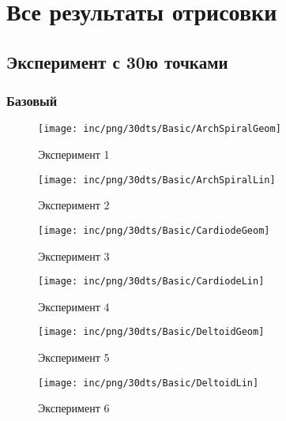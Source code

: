 \chapter{Все результаты отрисовки}
\label{cha:appendix1}

\section{Эксперимент с 30ю точками}
\subsection{Базовый}
\begin{figure}  
	\begin{minipage}{0,5\textwidth}
		\texttt{[image: inc/png/30dts/Basic/ArchSpiralGeom]}
		\label{fig:app1}
		\caption{Эксперимент 1}
	\end{minipage}
	\begin{minipage}{0,5\textwidth}
		\texttt{[image: inc/png/30dts/Basic/ArchSpiralLin]}
		\label{fig:app2}
		\caption{Эксперимент 2}
	\end{minipage}
	
	\begin{minipage}{0,5\textwidth}
		\texttt{[image: inc/png/30dts/Basic/CardiodeGeom]}
		\label{fig:app3}
		\caption{Эксперимент 3}
	\end{minipage}
	\begin{minipage}{0,5\textwidth}
		\texttt{[image: inc/png/30dts/Basic/CardiodeLin]}
		\label{fig:app4}
		\caption{Эксперимент 4}
	\end{minipage}
	
	\begin{minipage}{0,5\textwidth}
		\texttt{[image: inc/png/30dts/Basic/DeltoidGeom]}
		\label{fig:app1}
		\caption{Эксперимент 5}
	\end{minipage}
	\begin{minipage}{0,5\textwidth}
		\texttt{[image: inc/png/30dts/Basic/DeltoidLin]}
		\label{fig:app2}
		\caption{Эксперимент 6}
	\end{minipage}
\end{figure}


